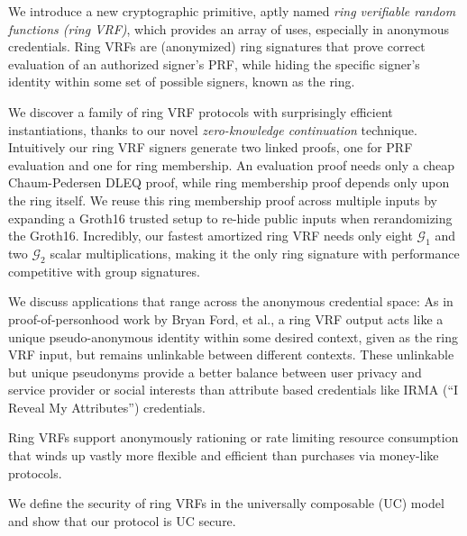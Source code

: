 
\def\eprintsmallskip{\smallskip}{}%
We introduce a new cryptographic primitive, aptly named
 \emph{ring verifiable random functions (ring VRF)},
 which provides an array of uses, especially in anonymous credentials.
Ring VRFs are (anonymized) ring signatures that prove correct evaluation
of an authorized signer's PRF, while hiding the specific signer's
identity within some set of possible signers, known as the ring.

We discover a family of ring VRF protocols with surprisingly efficient
instantiations, thanks to our novel {\em zero-knowledge continuation} technique.
%
Intuitively our ring VRF signers generate two linked proofs,
 one for PRF evaluation and one for ring membership. 
An evaluation proof needs only a cheap Chaum-Pedersen DLEQ proof,
while ring membership proof depends only upon the ring itself.
We reuse this ring membership proof across multiple inputs
by expanding a Groth16 trusted setup to re-hide public inputs when
 rerandomizing the Groth16.
%
Incredibly, our fastest amortized ring VRF needs only eight $\mathcal{G}_1$
 and two $\mathcal{G}_2$ scalar multiplications, 
making it the only ring signature with performance competitive with group signatures.

\eprintsmallskip

We discuss applications that range across the anonymous credential space:
As in proof-of-personhood work by Bryan Ford, et al.,
a ring VRF output acts like a unique pseudo-anonymous identity
 within some desired context, given as the ring VRF input,
but remains unlinkable between different contexts. 
These unlinkable but unique pseudonyms provide a better balance between
user privacy and service provider or social interests than attribute
based credentials like IRMA (``I Reveal My Attributes'') credentials.

\eprintsmallskip
Ring VRFs support anonymously rationing or rate limiting resource
consumption that winds up vastly more flexible and efficient than
purchases via money-like protocols.

\eprintsmallskip
We define the security of ring VRFs in the universally composable (UC) model and show that our protocol is UC secure.
